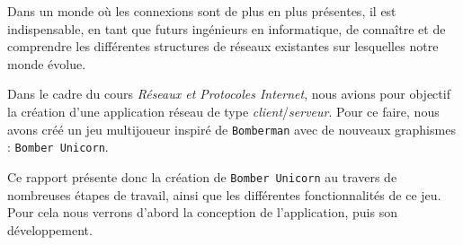 Dans un monde où les connexions sont de plus en plus présentes, il est indispensable, en tant que futurs ingénieurs en informatique, de connaître et de comprendre les différentes structures de réseaux existantes sur lesquelles notre monde évolue.

\vspace{0.5cm}

Dans le cadre du cours \textit{Réseaux et Protocoles Internet}, nous avions pour objectif la création d'une application réseau de type \textit{client}/\textit{serveur}. Pour ce faire, nous avons créé un jeu multijoueur inspiré de \texttt{Bomberman} avec de nouveaux graphismes : \texttt{Bomber Unicorn}.

\vspace{0.5cm}

Ce rapport présente donc la création de \texttt{Bomber Unicorn} au travers de nombreuses étapes de travail, ainsi que les différentes fonctionnalités de ce jeu. Pour cela nous verrons d'abord la conception de l'application, puis son développement.